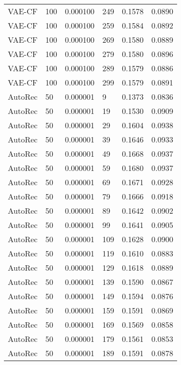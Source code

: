 \begin{tabular}{llrlrr}
  VAE-CF &  100 &  0.000100 &   249 &  0.1578 &       0.0890 \\
  VAE-CF &  100 &  0.000100 &   259 &  0.1584 &       0.0892 \\
  VAE-CF &  100 &  0.000100 &   269 &  0.1580 &       0.0889 \\
  VAE-CF &  100 &  0.000100 &   279 &  0.1580 &       0.0896 \\
  VAE-CF &  100 &  0.000100 &   289 &  0.1579 &       0.0886 \\
  VAE-CF &  100 &  0.000100 &   299 &  0.1579 &       0.0891 \\
 AutoRec &   50 &  0.000001 &     9 &  0.1373 &       0.0836 \\
 AutoRec &   50 &  0.000001 &    19 &  0.1530 &       0.0909 \\
 AutoRec &   50 &  0.000001 &    29 &  0.1604 &       0.0938 \\
 AutoRec &   50 &  0.000001 &    39 &  0.1646 &       0.0933 \\
 AutoRec &   50 &  0.000001 &    49 &  0.1668 &       0.0937 \\
 AutoRec &   50 &  0.000001 &    59 &  0.1680 &       0.0937 \\
 AutoRec &   50 &  0.000001 &    69 &  0.1671 &       0.0928 \\
 AutoRec &   50 &  0.000001 &    79 &  0.1666 &       0.0918 \\
 AutoRec &   50 &  0.000001 &    89 &  0.1642 &       0.0902 \\
 AutoRec &   50 &  0.000001 &    99 &  0.1641 &       0.0905 \\
 AutoRec &   50 &  0.000001 &   109 &  0.1628 &       0.0900 \\
 AutoRec &   50 &  0.000001 &   119 &  0.1610 &       0.0883 \\
 AutoRec &   50 &  0.000001 &   129 &  0.1618 &       0.0889 \\
 AutoRec &   50 &  0.000001 &   139 &  0.1590 &       0.0867 \\
 AutoRec &   50 &  0.000001 &   149 &  0.1594 &       0.0876 \\
 AutoRec &   50 &  0.000001 &   159 &  0.1591 &       0.0869 \\
 AutoRec &   50 &  0.000001 &   169 &  0.1569 &       0.0858 \\
 AutoRec &   50 &  0.000001 &   179 &  0.1561 &       0.0853 \\
 AutoRec &   50 &  0.000001 &   189 &  0.1591 &       0.0878 \\

\end{tabular}
